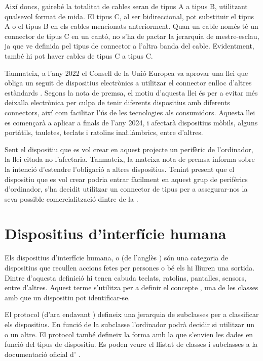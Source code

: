 Així doncs, gairebé la totalitat de cables  seran de tipus A a tipus
B, utilitzant qualsevol format de mida. El tipus C, al ser bidireccional, pot
substituir el tipus A o el tipus B en els cables mencionats anteriorment.
Quan un cable només té un connector de tipus C en un cantó, no s'ha de pactar
la jerarquia de mestre-esclau, ja que ve definida pel tipus de connector a
l'altra banda del cable. Evidentment, també hi pot haver cables de tipus C a
tipus C.

Tanmateix, a l'any 2022 el Consell de la Unió Europea va aprovar una llei
que obliga un seguit de dispositius electrònics a utilitzar el connector
 enlloc d'altres estàndards \cite{Council2022Common}. Segons la
nota de premsa, el motiu d'aquesta llei és per a evitar més deixalla electrònica
per culpa de tenir diferents dispositius amb diferents connectors, així com
facilitar l'ús de les tecnologies als consumidors. Aquesta llei
es començarà a aplicar a finals de l'any 2024, i afectarà dispositius mòbils, 
alguns portàtils, tauletes, teclats i ratolins ina\l.làmbrics, entre
d'altres.

Sent el dispositiu que es vol crear en aquest projecte un perifèric de
l'ordinador, la llei citada no l'afectaria. Tanmateix, la mateixa nota de premsa
informa sobre la intenció d'estendre l'obligació a altres dispositius.
Tenint present que el dispositiu que es vol crear podria entrar fàcilment en
aquest grup de perifèrics d'ordinador, s'ha decidit utilitzar un connector de
tipus  per a assegurar-nos la seva possible comercialització dintre
de la .

\section{Dispositius d'interfície humana}
\label{sec:hut}

Els dispositius d'interfície humana, o  (de l'anglès
) són una categoria de dispositius que recullen
accions fetes per persones o bé els hi lliuren una sortida. Dintre d'aquesta
definició hi tenen cabuda teclats, ratolins, pantalles, sensors, entre d'altres.
Aquest terme s'utilitza per a definir el concepte , una de les
classes  amb que un dispositiu pot identificar-se.

El protocol  (d'ara endavant ) defineix una jerarquia
de subclasses per a classificar els dispositius. En funció de la subclasse
l'ordinador podrà decidir si utilitzar un  o un altre. El protocol
també defineix la forma amb la que s'envien les dades en funció del tipus de
dispositiu. Es poden veure el llistat de classes i subclasses  a la
documentació oficial d' \cite{HidDefinition}.

